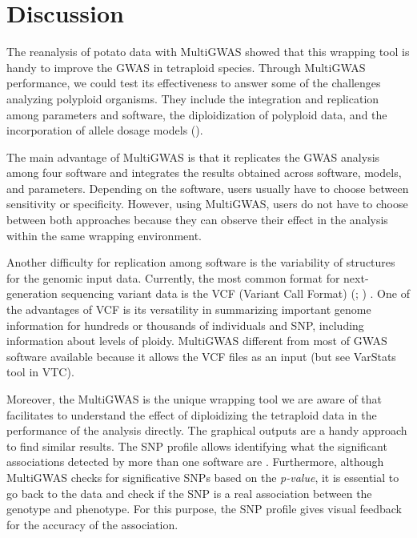 \documentclass{article}
\begin{document}
\section{Discussion}


The reanalysis of potato data with MultiGWAS showed that this wrapping tool is handy to improve the GWAS in tetraploid species. Through MultiGWAS performance, we could test its effectiveness to answer some of the challenges analyzing polyploid organisms. They include the integration and replication among parameters and software, the diploidization of polyploid data, and the incorporation of allele dosage models (\cite{dufresne2014}). 

The main advantage of MultiGWAS is that it replicates the GWAS analysis among four software and integrates the results obtained across software, models, and parameters. Depending on the software, users usually have to choose between sensitivity or specificity. However, using MultiGWAS, users do not have to choose between both approaches because they can observe their effect in the analysis within the same wrapping environment.  

Another difficulty for replication among software is the variability of structures for the genomic input data. Currently, the most common format for next-generation sequencing variant data is the VCF (Variant Call Format) (\cite{Danecek2011}; \cite{Ebbert2014}) . One of the advantages of VCF is its versatility in summarizing important genome information for hundreds or thousands of individuals and SNP, including information about levels of ploidy. MultiGWAS different from most of GWAS software available because it allows the VCF files as an input (but see VarStats tool in VTC).  

Moreover, the MultiGWAS is the unique wrapping tool we are aware of that facilitates to understand the effect of diploidizing the tetraploid data in the performance of the analysis directly. The graphical outputs are a handy approach to find similar results. The SNP profile allows identifying what the significant associations detected by more than one software are . Furthermore, although MultiGWAS checks for significative SNPs based on the \emph{p-value}, it is essential to go back to the data and check if the SNP is a real association between the genotype and phenotype. For this purpose, the SNP profile gives visual feedback for the accuracy of the association.
\end{document}
